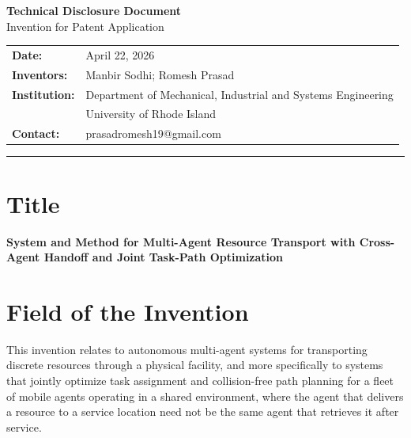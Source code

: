 \documentclass[12pt]{article}
\begin{document}
\begin{center}
    {\LARGE\bfseries Technical Disclosure Document}\\[6pt]
    {\large Invention for Patent Application}\\[18pt]
    \begin{tabular}{ll}
        \textbf{Date:}        & April 22, 2026 \\
        \textbf{Inventors:}   & Manbir Sodhi; Romesh Prasad \\
        \textbf{Institution:} & Department of Mechanical, Industrial and Systems Engineering \\
                              & University of Rhode Island \\
        \textbf{Contact:}     & prasadromesh19@gmail.com \\
    \end{tabular}
\end{center}

\vspace{12pt}
\hrule
\vspace{18pt}

\section{Title}

\textbf{System and Method for Multi-Agent Resource Transport with Cross-Agent Handoff and Joint Task-Path Optimization}

\section{Field of the Invention}

This invention relates to autonomous multi-agent systems for transporting discrete resources through a physical facility, and more specifically to systems that jointly optimize task assignment and collision-free path planning for a fleet of mobile agents operating in a shared environment, where the agent that delivers a resource to a service location need not be the same agent that retrieves it after service.
\end{document}
